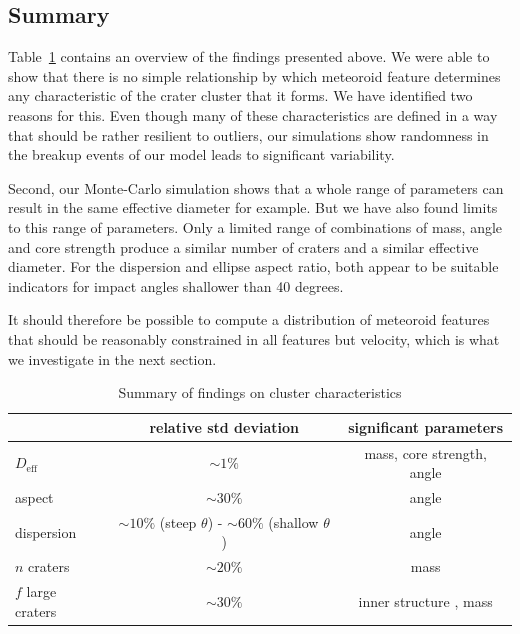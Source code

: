 \subsection{Summary}

Table~\ref{tab:characteristics_summary} contains an overview of the findings presented above. We were able to show that there is no simple relationship by which meteoroid feature determines any characteristic of the crater cluster that it forms. We have identified two reasons for this. Even though many of these characteristics are defined in a way that should be rather resilient to outliers, our simulations show randomness in the breakup events of our model leads to significant variability.

Second, our Monte-Carlo simulation shows that a whole range of parameters can result in the same effective diameter for example.
But we have also found limits to this range of parameters. Only a limited range of combinations of mass, angle and core strength produce a similar number of craters and a similar effective diameter. For the dispersion and ellipse aspect ratio, both appear to be suitable indicators for impact angles shallower than 40 degrees.

It should therefore be possible to compute a distribution of meteoroid features that should be reasonably constrained in all features but velocity, which is what we investigate in the next section.

\begin{table}
    \centering
    \begin{tabular}{l|c|c}
        & relative std deviation & significant parameters \\
        \hline
        $D_\mathrm{eff}$ & $\sim 1\%$ & mass, core strength, angle \\
        aspect & $\sim 30\%$ & angle \\
        dispersion & $\sim 10\%$ (steep $\theta$) - $\sim 60\%$ (shallow $\theta$) & angle \\
        $n$ craters & $ \sim 20\%$ & mass \\
        $f$ large craters & $\sim 30\%$& inner structure \citep{newland2019CFM18}, mass
    \end{tabular}
    \caption{Summary of findings on cluster characteristics}
    \label{tab:characteristics_summary}
\end{table}
